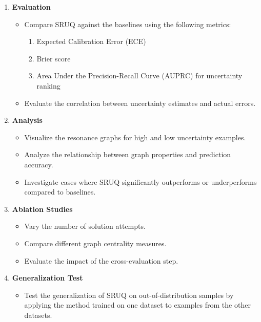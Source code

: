 \begin{tcolorbox}[colback=blue!5!white,colframe=blue!75!black,title=\textbf{Semantic Resonance Uncertainty Quantification (SRUQ) (Part 2)}]
\begin{enumerate}
\begin{enumerate}
            \item Construct the resonance graph using the pairwise evaluations.
            \item Compute the resonance score using graph centrality measures (e.g., PageRank).
            \item Map the resonance score to a calibrated uncertainty estimate using isotonic regression on the validation set.
        \end{enumerate}
        \item \textbf{Evaluation}
        \begin{itemize}
            \item Compare SRUQ against the baselines using the following metrics:
            \begin{enumerate}
                \item Expected Calibration Error (ECE)
                \item Brier score
                \item Area Under the Precision-Recall Curve (AUPRC) for uncertainty ranking
            \end{enumerate}
            \item Evaluate the correlation between uncertainty estimates and actual errors.
        \end{itemize}
        \item \textbf{Analysis}
        \begin{itemize}
            \item Visualize the resonance graphs for high and low uncertainty examples.
            \item Analyze the relationship between graph properties and prediction accuracy.
            \item Investigate cases where SRUQ significantly outperforms or underperforms compared to baselines.
        \end{itemize}
        \item \textbf{Ablation Studies}
        \begin{itemize}
            \item Vary the number of solution attempts.
            \item Compare different graph centrality measures.
            \item Evaluate the impact of the cross-evaluation step.
        \end{itemize}
        \item \textbf{Generalization Test}
        \begin{itemize}
            \item Test the generalization of SRUQ on out-of-distribution samples by applying the method trained on one dataset to examples from the other datasets.
        \end{itemize}
    \end{enumerate}
\end{tcolorbox}

